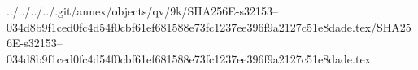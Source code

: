 ../../../../.git/annex/objects/qv/9k/SHA256E-s32153--034d8b9f1ced0fc4d54f0cbf61ef681588e73fc1237ee396f9a2127c51e8dade.tex/SHA256E-s32153--034d8b9f1ced0fc4d54f0cbf61ef681588e73fc1237ee396f9a2127c51e8dade.tex